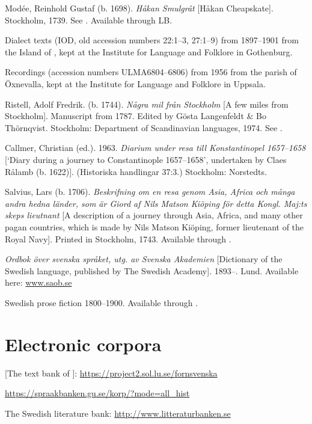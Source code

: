 \documentclass[output=paper]{langscibook}
\begin{document}
\begin{description}[font=\normalfont]
\item[Modée:] Modée, Reinhold Gustaf (b. 1698). \textit{Håkan Smulgråt} [Håkan Cheapskate]. Stockholm, 1739. See \citet{MarttalaStromquist2001}. Available through LB.
\item[\isi{Orust}:] Dialect texts (IOD, old accession numbers 22:1–3, 27:1–9) from 1897–1901 from the Island of , kept at the Institute for Language and Folklore in Gothenburg.
\item[Öxn:] Recordings (accession numbers ULMA6804–6806) from 1956 from the parish of Öxnevalla, kept at the Institute for Language and Folklore in Uppsala.
\item[Ristell:] Ristell, Adolf Fredrik. (b. 1744). \textit{Några mil från Stockholm} [A few miles from Stockholm]. Manuscript from 1787. Edited by Gösta Langenfeldt \& Bo Thörnqvist. Stockholm: Department of Scandinavian languages, 1974. See \citet{MarttalaStromquist2001}.
\item[Rålamb:] Callmer, Christian (ed.). 1963. \textit{Diarium under resa till Konstantinopel 1657–1658} [`Diary during a journey to Constantinople 1657–1658’, undertaken by Claes Rålamb (b. 1622)]. (Historiska handlingar 37:3.) Stockholm: Norstedts.
\item[Salvius:] Salvius, Lars (b. 1706). \textit{Beskrifning om en resa genom Asia, Africa och många andra hedna länder, som är Giord af Nils Matson Kiöping för detta Kongl. Maj:ts skeps lieutnant} [A description of a journey through Asia, Africa, and many other pagan countries, which is made by Nils Matson Kiöping, former lieutenant of the Royal Navy]. Printed in Stockholm, 1743. Available through .
\item[\isi{SAOB}:] \textit{Ordbok över svenska språket, utg. av Svenska Akademien} [Dictionary of the Swedish language, published by The Swedish Academy]. 1893–. Lund. Available here: \href{http://www.saob.se}{{www.saob.se}}
\item[SPF:] Swedish prose fiction 1800–1900. Available through .
\end{description}

\section*{Electronic corpora}

\begin{description}[font=\normalfont]
\item[FTB:]  [The text bank of ]: \url{https://project2.sol.lu.se/fornsvenska} 
\item[\isi{Korp}:] \url{https://spraakbanken.gu.se/korp/?mode=all_hist}
\item[LB:] The Swedish literature bank: \url{http://www.litteraturbanken.se}
\end{description}

{\sloppy\printbibliography[heading=subbibliography,notkeyword=this]}
\end{document}
